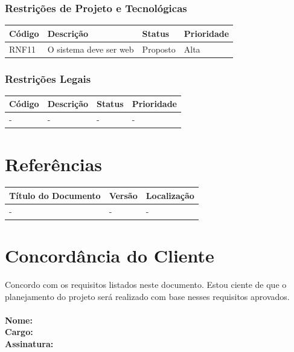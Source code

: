 \documentclass[a4paper, 12pt]{article}
\begin{document}
\subsubsection{Restrições de Projeto e Tecnológicas}
\begin{table}[ht]
	\centering

	\begin{tabular}{p{2cm}p{7cm}p{2cm}p{2cm}}
		\hline
		\cellcolor{gray}Código&\cellcolor{gray}Descrição&\cellcolor{gray}Status&\cellcolor{gray}Prioridade  \\
		\hline
        RNF11&O sistema deve ser web&Proposto&Alta\\
		\hline
	\end{tabular}
\end{table}%
\newpage
\subsubsection{Restrições Legais}
\begin{table}[ht]
	\rowcolors{1}{}{}
	\centering

	\begin{tabular}{p{2cm}p{7cm}p{2cm}p{2cm}}
		\hline
		\cellcolor{gray}Código&\cellcolor{gray}Descrição&\cellcolor{gray}Status&\cellcolor{gray}Prioridade  \\
		\hline
		-&-&-&-\\
		\hline
	\end{tabular}
\end{table}
\section{Referências}
\begin{table}[ht]
	\centering

	\begin{tabular}{p{4cm}p{2cm}p{7.5cm}}
		\hline
		\cellcolor{gray}Título do Documento&\cellcolor{gray}Versão&\cellcolor{gray}Localização  \\
		\hline
		-&-&-\\
		\hline
	\end{tabular}
\end{table}
\section{Concordância do Cliente}
Concordo com os requisitos listados neste documento. Estou ciente de que o planejamento do projeto será realizado com base nesses requisitos aprovados.
\\\\
\textbf{Nome:}
\\
\textbf{Cargo:}
\\
\textbf{Assinatura:}
\end{document}
